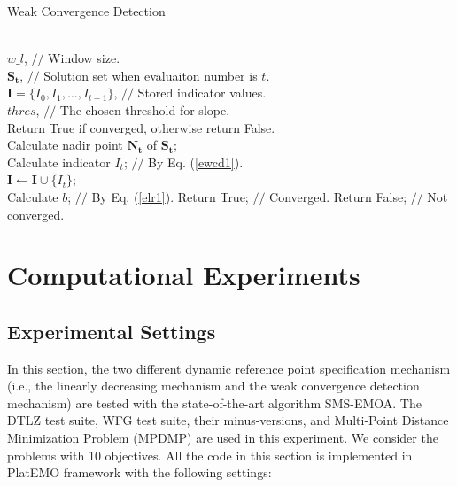 \documentclass[conference]{IEEEtran}
\begin{document}
\begin{algorithm}
  \caption{Weak Convergence Detection}
  \label{alg:wcd}
  \begin{algorithmic}
  \REQUIRE ~~\\
    $w\_l$, $//$ Window size.\\
    $\boldsymbol{S_{t}}$, $//$ Solution set when evaluaiton number is $t$.\\
    $\boldsymbol I = \{I_{0},I_{1},\dots,I_{t-1}\}$, $//$ Stored indicator values. \\
    $thres$, $//$ The chosen threshold for slope. \\ 
  \ENSURE Return True if converged, otherwise return False.~~\\
    Calculate nadir point $\boldsymbol{N_{t}}$ of $\boldsymbol{S_{t}}$; \\
    Calculate indicator $I_{t}$; $//$ By Eq. (\ref{ewcd1}). \\
    $\boldsymbol I \gets \boldsymbol I \cup \{I_{t}\}$; \\
    \STATE Calculate $b$; $//$ By Eq. (\ref{elr1}).
      \STATE Return True; $//$ Converged.
      \ENDIF
    \ENDIF
    \STATE Return False; $//$ Not converged.
  \end{algorithmic}
\end{algorithm}
% 
% 
%
\section{Computational Experiments}
\subsection{Experimental Settings}
In this section, the two different dynamic reference point specification mechanism 
(i.e., the linearly decreasing mechanism and the weak convergence detection mechanism) 
are tested with the state-of-the-art algorithm SMS-EMOA\cite{smsemoa}. 
The DTLZ test suite\cite{DTLZ}, WFG test suite\cite{WFG}, 
their minus-versions\cite{minusTestProblem}, 
and Multi-Point Distance Minimization Problem (MPDMP)\cite{dmp} are used in this experiment. 
We consider the problems with 10 objectives. 
All the code in this section is implemented in PlatEMO framework\cite{PlatEMO}
with the following settings: 
\end{document}
